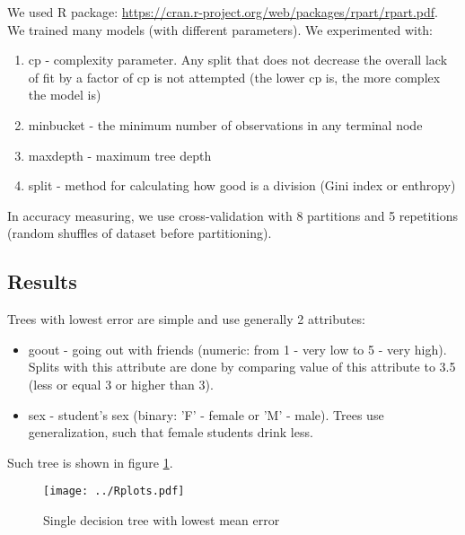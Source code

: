 \documentclass[a4paper]{article}
\begin{document}
\begin{multicols}{2}
We used R package: \url{https://cran.r-project.org/web/packages/rpart/rpart.pdf}.
We trained many models (with different parameters).
We experimented with:
\begin{enumerate}
    \item cp - complexity parameter.
        Any split that does not decrease the overall lack of fit by a factor of cp is not attempted
        (the lower cp is, the more complex the model is)
    \item minbucket - the minimum number of observations in any terminal node
    \item maxdepth - maximum tree depth
    \item split - method for calculating how good is a division (Gini index or enthropy)
\end{enumerate}
In accuracy measuring, we use cross-validation with 8 partitions
and 5 repetitions (random shuffles of dataset before partitioning).
% 
\subsection{Results}
\label{singleConc}

Trees with lowest error are simple and use generally 2 attributes:
\begin{itemize}
    \item goout - going out with friends (numeric: from 1 - very low to 5 - very high).
        Splits with this attribute are done by comparing value of this attribute to 3.5
        (less or equal 3 or higher than 3).
    \item sex - student's sex (binary: 'F' - female or 'M' - male).
        Trees use generalization, such that female students drink less.
\end{itemize}
Such tree is shown in figure \ref{fig:single}.

\begin{figure}[H]
    \centering
    \texttt{[image: ../Rplots.pdf]}
    \label{fig:single}
    \caption[]{Single decision tree with lowest mean error}
\end{figure}

% 
% 
% 

\end{multicols}
\end{document}
